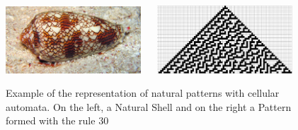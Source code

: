 \begin{figure}
        \centering
                \includegraphics[width=0.45\textwidth]{images/Theory/Cellular_A/shell.jpeg}
          ~~
                \includegraphics[width=0.45\textwidth]{images/Theory/Cellular_A/Rule30.png}
        \caption{Example of the representation of natural patterns with cellular automata. On the left, a Natural Shell \cite{Shiffman2012} and on the right a Pattern formed with the rule 30}
		\label{fig:CArule30shell}
\end{figure}




